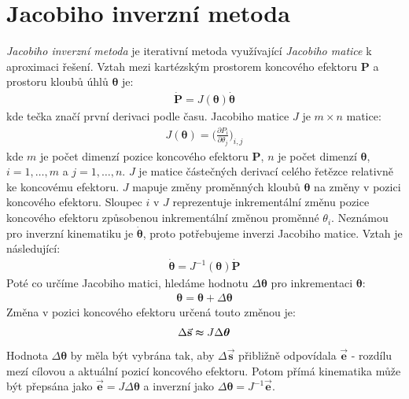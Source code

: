 \section{Jacobiho inverzní metoda}
\textit{Jacobiho inverzní metoda} \cite{Buss09introductionto, welman, AristidouTR632} je iterativní metoda využívající \textit{Jacobiho matice} k aproximaci řešení. Vztah mezi kartézským prostorem koncového efektoru $\mathbf{P}$ a prostoru kloubů úhlů $\boldsymbol{\theta}$ je:
\begin{eqnarray}
\mathbf{\dot{P}} = J(\boldsymbol{\theta})\boldsymbol{\dot{\theta}}\label{r.jacobian_vztah}
\end{eqnarray}
kde tečka značí první derivaci podle času. Jacobiho matice $J$ je $m \times n$ matice:
\begin{eqnarray}
J(\boldsymbol{\theta}) = \bigg(\frac{\partial P_i}{\partial \theta_j}\bigg)_{i,j}\label{r.jacobian_matrix}
\end{eqnarray}
kde $m$ je počet dimenzí pozice koncového efektoru $\mathbf{P}$, $n$ je počet dimenzí $\boldsymbol{\theta}$, $i = 1,\dots,m$ a $j = 1,\dots,n$. $J$ je matice částečných derivací celého řetězce relativně ke koncovému efektoru. $J$ mapuje změny proměnných kloubů $\boldsymbol{\theta}$ na změny v pozici koncového efektoru. Sloupec $i$ v $J$ reprezentuje inkrementální změnu pozice koncového efektoru způsobenou inkrementální změnou proměnné $\theta_i$. 
Neznámou pro inverzní kinematiku je $\boldsymbol{\dot{\theta}}$, proto potřebujeme inverzi Jacobiho matice. Vztah je následující:
\begin{eqnarray}
\boldsymbol{\dot{\theta}} = J^{-1}(\boldsymbol{\theta})\mathbf{\dot{P}}\label{r.jacobian_vztah_inverse}
\end{eqnarray}
Poté co určíme Jacobiho matici, hledáme hodnotu $\Delta\boldsymbol{\theta}$ pro inkrementaci $\boldsymbol{\theta}$:
\begin{eqnarray}
\boldsymbol{\theta} = \boldsymbol{\theta} + \Delta\boldsymbol{\theta}\label{r.jacobian_increment}
\end{eqnarray}
Změna v pozici koncového efektoru určená touto změnou je:
\begin{eqnarray}
\Delta\vec{\mathbf{s}} \thickapprox J\Delta\boldsymbol{\theta}\label{r.jacobian_change}
\end{eqnarray}
Hodnota $\Delta\boldsymbol{\theta}$ by měla být vybrána tak, aby $\Delta\vec{\mathbf{s}}$ přibližně odpovídala $\vec{\mathbf{e}}$ - rozdílu mezí cílovou a aktuální pozicí koncového efektoru. Potom přímá kinematika může být přepsána jako $\vec{\mathbf{e}} = J\Delta\boldsymbol{\theta}$ a inverzní jako $\Delta\boldsymbol{\theta} = J^{-1}\vec{\mathbf{e}}$.

